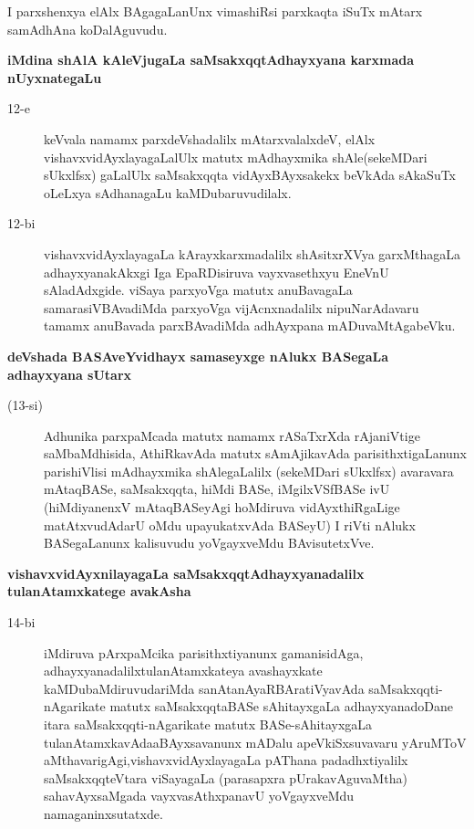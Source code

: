 I parxshenxya elAlx BAgagaLanUnx vimashiRsi parxkaqta iSuTx mAtarx samAdhAna koDalAguvudu.

\newpage

{\bigskip
\noindent
{\large\bf iMdina shAlA kAleVjugaLa saMsakxqqtAdhayxyana karxmada nUyxnategaLu}}\label{page43}
\begin{description}
\item[12-e] keVvala namamx parxdeVshadalilx mAtarxvalalxdeV, elAlx vishavxvidAyxlayagaLalUlx matutx mAdhayxmika shAle\-(sekeM\-Dari sUkxlfsx) gaLalUlx saMsakxqqta vidAyxBAyxsakekx beVkAda sAkaSuTx oLeLxya sAdhanagaLu kaMDu\-baruvu\-dilalx.

\item[12-bi] vishavxvidAyxlayagaLa kArayxkarxmadalilx shAsitxrXVya garxMthagaLa adhayxyanakAkxgi Iga EpaRDisiruva \-vayxva\-sethxyu EneVnU sAladAdxgide. viSaya parxyoVga matutx anuBavagaLa samarasiVBAvadiMda parx\-yoVga vijAcnxnadalilx nipuNarAdavaru tamamx anuBavada parxBAvadiMda adhAyxpana mADu\-vaMtAga\-beVku.
\end{description}

{\medskip
\noindent
{\large\bf deVshada BASAveYvidhayx samaseyxge nAlukx BASegaLa adhayxyana sUtarx}}\label{page44}

\begin{description}
\item[(13-si)] Adhunika parxpaMcada matutx namamx rASaTxrXda rAjaniVtige saMbaMdhisida, AthiRkavAda matutx sAmAjika\-vAda parisithxtigaLanunx parishiVlisi mAdhayxmika shAlegaLalilx (sekeMDari sUkxlfsx) avaravara mAtaq\-BASe, saMsakxqqta, hiMdi BASe, iMgilxVSfBASe ivU (hiMdiyanenxV mAtaqBASeyAgi hoMdiruva vidAyx\-thiRgaLige matAtxvudAdarU oMdu upayukatxvAda BASeyU) I riVti nAlukx BASegaLanunx kalisuvudu yoVgayxveMdu BAvisutetxVve.
\end{description}

{\medskip
\noindent
{\large\bf vishavxvidAyxnilayagaLa saMsakxqqtAdhayxyanadalilx tulanAtamxkatege avakAsha}}\label{page44a}

\begin{description}
\item[14-bi] iMdiruva pArxpaMcika parisithxtiyanunx gamanisidAga, adhayxyanadalilx\break tulanA\-tamxkateya avashayx\-kate kaMDubaMdiruvudariMda sanAtanAyaRBAra\-tiVyavAda saMsakxqqti-nAgarikate matutx saMsakxqqtaBASe sAhitayxgaLa adhayxyana\-doDane itara saMsakxqqti-nAgarikate matutx BASe-sAhitayxgaLa tulanAtamxka\-vAda\break aBAyxsavanunx mADalu apeVkiSxsuvavaru yAruMToV aMthavarigAgi,\break vishavxvidAyxlayagaLa pAThana padadhxtiyalilx saMsakxqqteVtara viSayagaLa (parasapxra pUrakavAguvaMtha) sahavAyxsaMgada vayxvasAthxpa\-navU yoVgayxveMdu namaganinxsutatxde.
\end{description}

